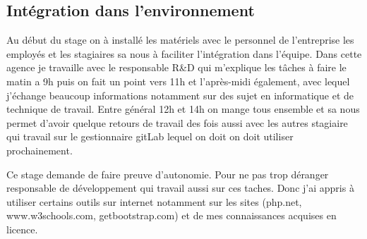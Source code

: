 \subsection{Intégration dans l’environnement}
Au début du stage on à installé les matériels avec le personnel de l'entreprise les employés et les stagiaires sa nous à faciliter l'intégration dans l'équipe.
Dans cette agence je travaille avec le responsable R\&D qui m'explique les tâches à faire le matin a 9h puis on fait un point vers 11h et l'après-midi également, avec lequel j'échange beaucoup informations notamment sur des sujet en informatique et de technique de travail.
Entre général 12h et 14h on mange tous ensemble et sa nous permet d'avoir quelque retours de travail des fois aussi avec les autres stagiaire qui travail sur le gestionnaire gitLab lequel on doit on doit utiliser prochainement.

Ce stage demande de faire preuve d'autonomie. Pour ne pas trop déranger responsable de développement qui travail aussi sur ces taches. Donc j'ai appris à utiliser certains outils sur internet notamment sur les sites (php.net, www.w3schools.com, getbootstrap.com) et de mes connaissances acquises en licence. 
